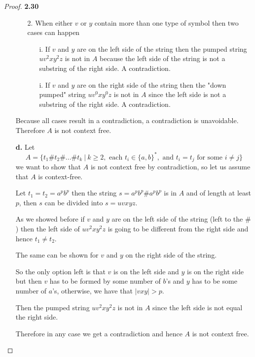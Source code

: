 \documentclass[11pt]{article}
\theoremstyle{definition}
\begin{document}
\begin{proof}{\textbf{2.30}}
\begin{itemize}
\begin{itemize}
        \item [2.] When either $v$ or $y$ contain more than one type of symbol
        then two cases can happen
        \begin{itemize}
            \item [i.] If $v$ and $y$ are on the left side of the string then
            the pumped string $uv^2xy^2z$ is not in $A$ because the left side
            of the string is not a substring of the right side.
            A contradiction.
            \item [i.] If $v$ and $y$ are on the right side of the string then
            the "down pumped" string $uv^0xy^0z$ is not in $A$ since the left
            side is not a substring of the right side.
            A contradiction.
        \end{itemize}
    \end{itemize}
    Because all cases result in a contradiction, a contradiction is unavoidable.
    Therefore $A$ is not context free.

\cleardoublepage
    \item [\textbf{d.}]
    Let $$A = \{t_1 \# t_2 \# ... \# t_k ~|~k\geq 2,
    \text{ each } t_i \in \{a,b\}^*, \text{ and } t_i = t_j \text{ for some }
    i \neq j \}$$
    we want to show  that $A$ is not context free by contradiction, so let us
    assume that $A$ is context-free.

    Let $t_1 = t_2 = a^pb^p$ then the string $s = a^pb^p\#a^pb^p$ is in $A$ and
    of length at least $p$, then $s$ can be divided into $s = uvxyz$.

    As we showed before if $v$ and $y$ are on the left side of the string 
    (left to the $\#$) then the left side of $uv^2xy^2z$ is going to be
    different from the right side and hence $t_1 \neq t_2$.

    The same can be shown for $v$ and $y$ on the right side of the string.

    So the only option left is that $v$ is on the left side and $y$ is on the
    right side but then $v$ has to be formed by some number of $b$'s and
    $y$ has to be some number of $a$'s, otherwise, we have that $|vxy| > p$.

    Then the pumped string $uv^2xy^2z$ is not in $A$ since the left side is
    not equal the right side.

    Therefore in any case we get a contradiction and hence $A$ is not context
    free.
\end{itemize}
\end{proof}
\end{document}

